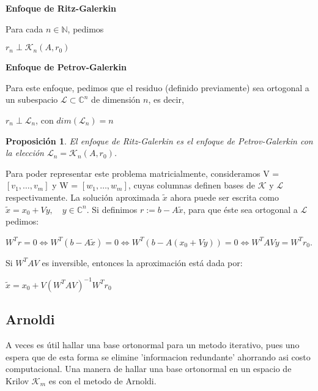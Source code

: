 \documentclass[12pt, oneside]{book}
\begin{document}
\begin{flushleft}
	\textbf{Enfoque de Ritz-Galerkin}
\end{flushleft}
Para cada $n \in \mathbb{N}$, pedimos
\begin{center}
	$r_n \perp \mathcal{K}_{n}(A, r_0)$
\end{center}
\begin{flushleft}
	\textbf{Enfoque de Petrov-Galerkin}
\end{flushleft}
Para este enfoque, pedimos que el residuo (definido previamente) sea ortogonal a un subespacio $\mathcal{L} \subset \mathbb{C}^{n}$ de dimensión $n$, es decir,
\begin{center}
	$r_n \perp \mathcal{L}_n$, con $dim(\mathcal{L}_n) = n$
\end{center}
\newtheorem{proposicion}{Proposición}
\begin{proposicion}
	El enfoque de Ritz-Galerkin es el enfoque de Petrov-Galerkin con la elección $\mathcal{L}_n = \mathcal{K}_{n}(A, r_0)$.
\end{proposicion}
Para poder representar este problema matricialmente, consideramos V = $[v_1, \ldots, v_m]$ y W = $[w_1, \ldots, w_m]$, cuyas columnas definen bases de $\mathcal{K}$ y $\mathcal{L}$ respectivamente. La solución aproximada $\tilde{x}$ ahora puede ser escrita como $\tilde{x} = x_0 + Vy, \quad y \in \mathbb{C}^n$. Si definimos $r := b - A\tilde{x}$, para que éste sea ortogonal a $\mathcal{L}$ pedimos:
\begin{center}
	$W^Tr = 0 \iff W^T(b - A\tilde{x}) = 0 \iff W^T(b - A(x_0 + Vy)) = 0 \iff \boxed{W^TAVy = W^Tr_0}$.
\end{center}
Si $W^TAV$ es inversible, entonces la aproximación está dada por:
\begin{center}
	$\tilde{x} = x_0 + V(W^TAV)^{-1}W^Tr_0$
\end{center}

\subsection{Arnoldi}

A veces es útil hallar una base ortonormal para un metodo iterativo, pues uno espera que de esta forma se elimine 'informacion redundante' ahorrando asi costo computacional. Una manera de hallar una base ortonormal en un espacio de Krilov $\mathcal{K}_m$ es con el metodo de Arnoldi.
	
\end{document}
